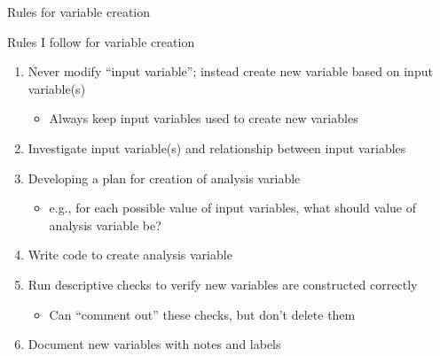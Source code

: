 \documentclass[8pt,ignorenonframetext,dvipsnames]{beamer}
\providecommand{\tightlist}{%
  \setlength{\itemsep}{0pt}\setlength{\parskip}{0pt}}
\begin{document}
\begin{frame}{Rules for variable creation}

Rules I follow for variable creation

\begin{enumerate}
\def\labelenumi{\arabic{enumi}.}
\tightlist
\item
  \medskip Never modify ``input variable''; instead create new variable
  based on input variable(s)

  \begin{itemize}
  \tightlist
  \item
    Always keep input variables used to create new variables
  \end{itemize}
\item
  Investigate input variable(s) and relationship between input variables
\item
  Developing a plan for creation of analysis variable

  \begin{itemize}
  \tightlist
  \item
    e.g., for each possible value of input variables, what should value
    of analysis variable be?
  \end{itemize}
\item
  Write code to create analysis variable
\item
  Run descriptive checks to verify new variables are constructed
  correctly

  \begin{itemize}
  \tightlist
  \item
    Can ``comment out'' these checks, but don't delete them
  \end{itemize}
\item
  Document new variables with notes and labels
\end{enumerate}

\end{frame}
\end{document}
